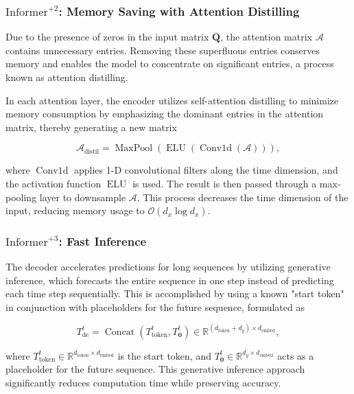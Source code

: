 \subsubsection*{\textbf{$\text{Informer}^{+2}$: Memory Saving with Attention Distilling}}

Due to the presence of zeros in the input matrix $\overline{\mathbf{Q}}$, the attention matrix $\mathcal{A}$ contains unnecessary entries. Removing these superfluous entries conserves memory and enables the model to concentrate on significant entries, a process known as attention distilling.

In each attention layer, the encoder utilizes self-attention distilling to minimize memory consumption by emphasizing the dominant entries in the attention matrix, thereby generating a new matrix

\begin{equation}
\mathcal{A}_{\text{distil}} = \operatorname{MaxPool}\left(\operatorname{ELU}\left(\operatorname{Conv1d}\left(\mathcal{A}\right)\right)\right),
\end{equation}

where $\operatorname{Conv1d}$ applies 1-D convolutional filters along the time dimension, and the activation function $\operatorname{ELU}$ \cite{al2023fhic} is used. The result is then passed through a max-pooling layer to downsample $\mathcal{A}$. This process decreases the time dimension of the input, reducing memory usage to $\mathcal{O}(d_x \log d_x)$.

\subsubsection*{\textbf{$\text{Informer}^{+3}$: Fast Inference}}

The decoder accelerates predictions for long sequences by utilizing generative inference, which forecasts the entire sequence in one step instead of predicting each time step sequentially. This is accomplished by using a known "start token" in conjunction with placeholders for the future sequence, formulated as

\begin{equation}
T_{\mathrm{de}}^{t} = \operatorname{Concat}\left(T_{\text{token}}^{t}, T_{\mathbf{0}}^{t}\right) \in \mathbb{R}^{(d_{\text{token}} + d_y) \times d_{\text{embed}}},
\end{equation}

where $T_{\text{token}}^{t} \in \mathbb{R}^{d_{\text{token}} \times d_{\text{embed}}}$ is the start token, and $T_{\mathbf{0}}^{t} \in \mathbb{R}^{d_y \times d_{\text{embed}}}$ acts as a placeholder for the future sequence. This generative inference approach significantly reduces computation time while preserving accuracy.



